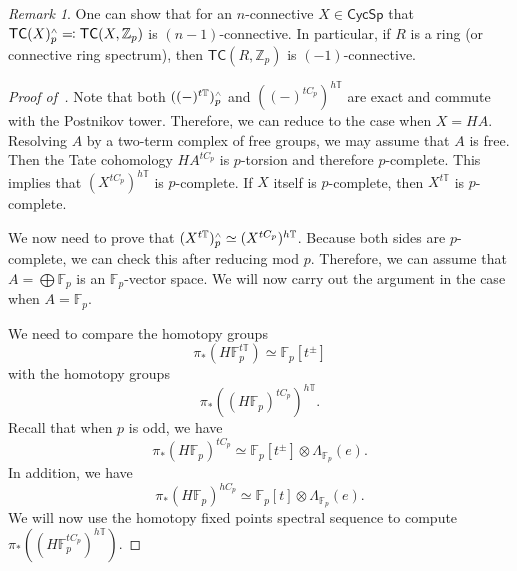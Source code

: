 \documentclass[10pt, oneside]{memoir}
\theoremstyle{definition}
\theoremstyle{remark}
\newtheorem{rmk}[thm]{Remark}
\theoremstyle{plain}
\theoremstyle{definition}
\theoremstyle{remark}
\newcommand{\Z}{\mathbb{Z}}
\newcommand{\F}{\mathbb{F}}
\newcommand{\T}{\mathbb{T}}
\newcommand{\ms}[1]{\mathsf{#1}}
\newcommand{\1}{\mathbf{1}}
\newcommand{\2}{\mathbf{2}}
\newcommand{\3}{\mathbf{3}}
\newcommand{\TC}{\ms{TC}}
\newcommand{\sw}{\mathsmaller{\wedge}}
\begin{document}
\begin{rmk}
    One can show that for an $n$-connective $X \in \ms{CycSp}$ that $\TC(X)^{\sw}_p \eqqcolon \TC(X,\Z_p)$ is $(n-1)$-connective. In particular, if $R$ is a ring (or connective ring spectrum), then $\TC(R, \Z_p)$ is $(-1)$-connective.
\end{rmk}

\begin{proof}[Proof of~]
    Note that both $((-)^{t\T})_p^{\sw}$ and $((-)^{tC_p})^{h\T}$ are exact and commute with the Postnikov tower. Therefore, we can reduce to the case when $X = HA$. Resolving $A$ by a two-term complex of free groups, we may assume that $A$ is free. Then the Tate cohomology $HA^{tC_p}$ is $p$-torsion and therefore $p$-complete. This implies that $(X^{tC_p})^{h\T}$ is $p$-complete. If $X$ itself is $p$-complete, then $X^{t\T}$ is $p$-complete.

    We now need to prove that $(X^{t\T})^{\sw}_p \simeq (X^{tC_p})^{h\T}$. Because both sides are $p$-complete, we can check this after reducing mod $p$. Therefore, we can assume that $A = \bigoplus \F_p$ is an $\F_p$-vector space. We will now carry out the argument in the case when $A = \F_p$.

    We need to compare the homotopy groups
    \[ \pi_*(H \F_p^{t\T}) \simeq \F_p[t^{\pm}] \]
    with the homotopy groups
    \[ \pi_* ((H\F_p)^{tC_p})^{h\T}. \]
    Recall that when $p$ is odd, we have
    \[ \pi_* (H\F_p)^{tC_p} \simeq \F_p[t^{\pm}] \otimes \Lambda_{\F_p}(e). \]
    In addition, we have
    \[ \pi_* (H\F_p)^{h C_p} \simeq \F_p[t] \otimes \Lambda_{\F_p}(e). \]
    We will now use the homotopy fixed points spectral sequence to compute $\pi_* ((H \F_p^{tC_p})^{h\T})$.


\end{proof}
\end{document}
